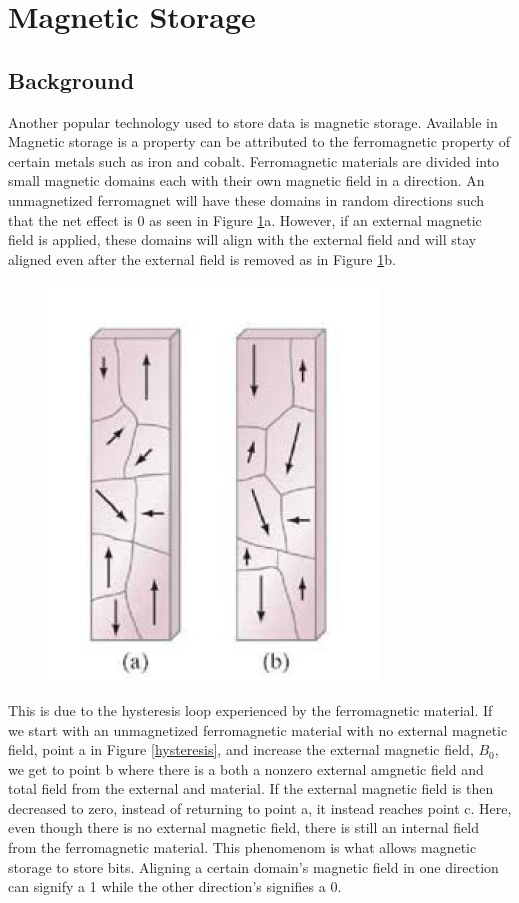 \documentclass[ aip, 12pt]{revtex4-1} %
\begin{document}
\section{Magnetic Storage}
\subsection{Background}
Another popular technology used to store data is magnetic storage. Available in  Magnetic storage is a property can be attributed to the ferromagnetic property of certain metals such as iron and cobalt. Ferromagnetic materials are divided into small magnetic domains each with their own magnetic field in a direction. An unmagnetized ferromagnet will have these domains in random directions such that the net effect is 0 as seen in Figure \ref{domain}a. However, if an external magnetic field is applied, these domains will align with the external field and will stay aligned even after the external field is removed as in Figure \ref{domain}b.

\begin{figure}[H]
\centerline{\includegraphics[scale=.45]{magneticDomain.png}}
\caption{ }
\label{domain}
\end{figure} 
This is due to the hysteresis loop experienced by the ferromagnetic material. If we start with an unmagnetized ferromagnetic material with no external magnetic field, point a in Figure \ref{hysteresis}, and increase the external magnetic field, $B_0$, we get to point b where there is a both a nonzero external amgnetic field and total field from the external and material. If the external magnetic field is then decreased to zero, instead of returning to point a, it instead reaches point c. Here, even though there is no external magnetic field, there is still an internal field from the ferromagnetic material. This phenomenom is what allows magnetic storage to store bits. Aligning a certain domain's magnetic field in one direction can signify a 1 while the other direction's signifies a 0.
\end{document}

